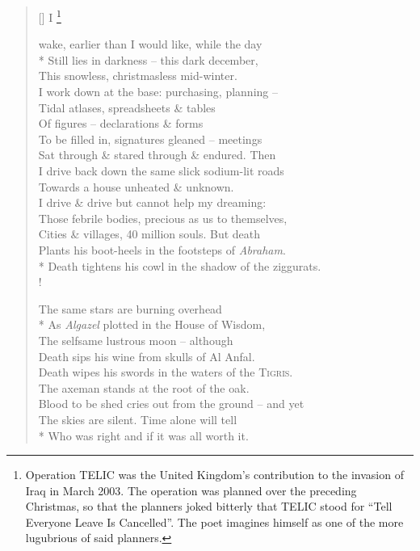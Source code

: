 \documentclass[openany]{amsbook}
\newcommand\blfootnote[1]{%
    \begingroup
    \renewcommand\thefootnote{}\footnote{#1}%
    \addtocounter{footnote}{-1}%
    \endgroup
}
\begin{document}
\settowidth{\versewidth}{I wake, earlier than I would like, while the day}
\begin{verse}[\versewidth]
    I\blfootnote{Operation TELIC was the United Kingdom's contribution to the invasion of Iraq in March 2003. The operation was planned over the preceding Christmas, so that the planners joked bitterly that TELIC stood for ``Tell Everyone Leave Is Cancelled''. The poet imagines himself as one of the more lugubrious of said planners.} wake, earlier than I would like, while the day\\*
    Still lies in darkness -- this dark december,\\
    This snowless, christmasless mid-winter.\\
    I work down at the base: purchasing, planning --\\
    Tidal atlases, spreadsheets \& tables\\
    Of figures -- declarations \& forms\\
    To be filled in, signatures gleaned -- meetings\\
    Sat through \& stared through \& endured. Then\\
    I drive back down the same slick sodium-lit roads\\
    Towards a house unheated \& unknown.\\
    I drive \& drive but cannot help my dreaming:\\
    Those febrile bodies, precious as us to themselves,\\
    Cities \& villages, 40 million souls. But death\\
    Plants his boot-heels in the footsteps of \textit{Abraham}.\\*
    Death tightens his cowl in the shadow of the ziggurats.\\!

    The same stars are burning overhead\\*
    As \textit{Algazel} plotted in the House of Wisdom,\\
    The selfsame lustrous moon -- although\\
    Death sips his wine from skulls of Al Anfal.\\
    Death wipes his swords in the waters of the \textsc{Tigris}.\\
    The axeman stands at the root of the oak.\\
    Blood to be shed cries out from the ground -- and yet\\
    The skies are silent. Time alone will tell\\*
    Who was right and if it was all worth it.
\end{verse}
\end{document}
